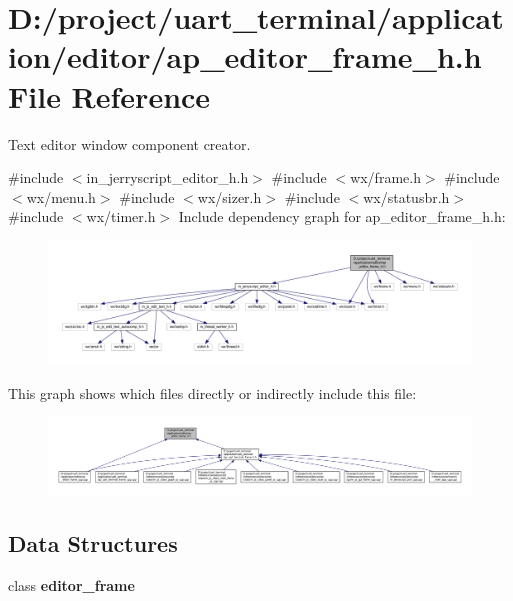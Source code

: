 \section{D\+:/project/uart\+\_\+terminal/application/editor/ap\+\_\+editor\+\_\+frame\+\_\+h.h File Reference}
\label{ap__editor__frame__h_8h}


Text editor window component creator.  


{\ttfamily \#include $<$in\+\_\+jerryscript\+\_\+editor\+\_\+h.\+h$>$}\newline
{\ttfamily \#include $<$wx/frame.\+h$>$}\newline
{\ttfamily \#include $<$wx/menu.\+h$>$}\newline
{\ttfamily \#include $<$wx/sizer.\+h$>$}\newline
{\ttfamily \#include $<$wx/statusbr.\+h$>$}\newline
{\ttfamily \#include $<$wx/timer.\+h$>$}\newline
Include dependency graph for ap\+\_\+editor\+\_\+frame\+\_\+h.\+h\+:
\nopagebreak
\begin{figure}[H]
\begin{center}
\leavevmode
\includegraphics[width=350pt]{ap__editor__frame__h_8h__incl}
\end{center}
\end{figure}
This graph shows which files directly or indirectly include this file\+:
\nopagebreak
\begin{figure}[H]
\begin{center}
\leavevmode
\includegraphics[width=350pt]{ap__editor__frame__h_8h__dep__incl}
\end{center}
\end{figure}
\subsection*{Data Structures}
\begin{DoxyCompactItemize}
\item 
class \textbf{ editor\+\_\+frame}
\end{DoxyCompactItemize}


